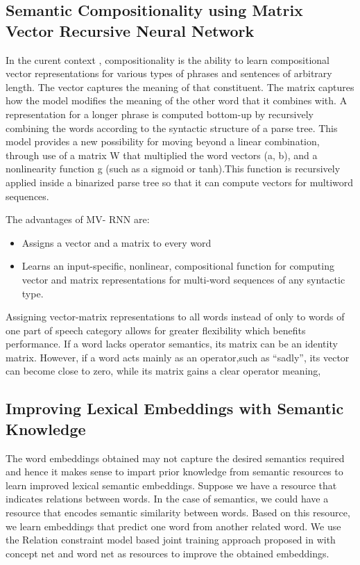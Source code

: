 \documentclass{acm_proc_article-sp}
\begin{document}
\subsection{Semantic Compositionality using Matrix Vector Recursive Neural Network}

In the curent context , compositionality is the ability to learn compositional vector representations for various types of phrases and sentences of arbitrary length. The vector captures the meaning of
that constituent. The matrix captures how the model modifies the meaning of the other word that it combines with. A representation for a longer phrase is computed bottom-up by recursively combining the words according to the syntactic structure of a parse tree. This model provides a new possibility for moving beyond a linear combination, through use of a matrix W that multiplied the word vectors (a, b), and a nonlinearity function g (such as a sigmoid or tanh).This function is recursively applied inside a binarized parse tree so that it can compute vectors for multiword sequences.

The advantages of MV- RNN are:
\begin{itemize}
\item Assigns a vector and a matrix to every word
\item Learns an input-specific, nonlinear, compositional function for computing vector and matrix representations for multi-word sequences of any syntactic type. 
\end{itemize}

Assigning vector-matrix representations to all words instead of only to words of one part of speech category allows for greater flexibility which benefits performance. If a word lacks operator semantics, its matrix can be an identity matrix. However, if a word acts mainly as an operator,such as “sadly”, its vector can become close to zero, while its matrix gains a clear operator meaning, 

\subsection{Improving Lexical Embeddings with Semantic Knowledge}

The word embeddings obtained may not capture the desired semantics required and hence it makes sense to impart prior knowledge from semantic resources to learn improved lexical semantic embeddings. Suppose we have a resource that indicates relations between words. In the case of semantics, we could have a resource that encodes semantic similarity between words. Based on this resource, we learn embeddings that predict one word from another related word. We use the Relation constraint model based joint training approach proposed in \cite{yu2014improving} with concept net and word net as resources to improve the obtained embeddings.
\end{document}
